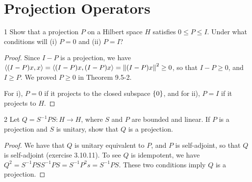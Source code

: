 \section{Projection Operators}


\begin{exercise}{1}
Show that a projection $P$ on a Hilbert space $H$ satisfies $0 \leq P \leq I$.
Under what conditions will (i) $P = 0$ and (ii) $P = I$?
\end{exercise}
\begin{proof}
Since $I - P$ is a projection, we have $\langle (I-P) x, x\rangle = \langle (I-P) x, (I-P) x\rangle = \left\lVert (I-P) x\right\rVert^2 \geq 0$, so that $I - P \geq 0$, and $I \geq P$.
We proved $P \geq 0$ in Theorem 9.5-2.

For i), $P = 0$ if it projects to the closed subspace $\{0\}$, and for ii), $P = I$ if it projects to $H$.
\end{proof} 

\begin{exercise}{2}
Let $Q = S^{-1} P S: H \to H$, where $S$ and $P$ are bounded and linear.
If $P$ is a projection and $S$ is unitary, show that $Q$ is a projection.
\end{exercise}
\begin{proof}
We have that $Q$ is unitary equivalent to $P$, and $P$ is self-adjoint, so that $Q$ is self-adjoint (exercise 3.10.11).
To see $Q$ is idempotent, we have $Q^2 = S^{-1} P S S^{-1} P S = S^{-1} P^2 s = S^{-1} P S$.
These two conditions imply $Q$ is a projection.
\end{proof} 

